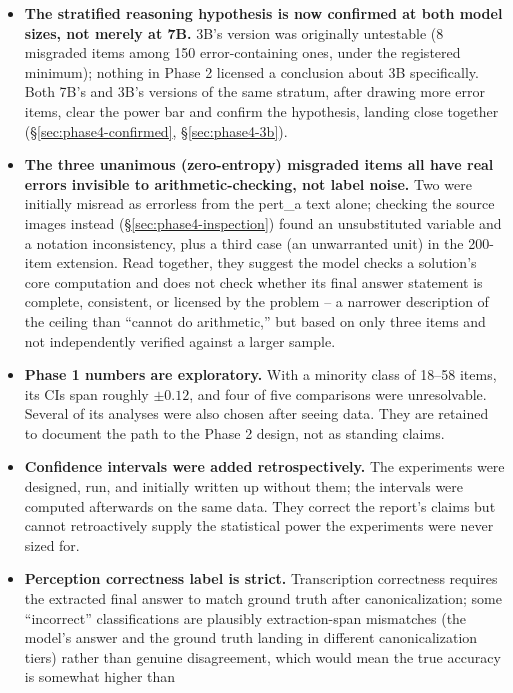 \documentclass[11pt]{article}
\begin{document}
\begin{itemize}
  \item \textbf{The stratified reasoning hypothesis is now confirmed at both
    model sizes, not merely at 7B.} 3B's version was originally untestable
    (8 misgraded items among 150 error-containing ones, under the
    registered minimum); nothing in Phase 2 licensed a conclusion about 3B
    specifically. Both 7B's and 3B's versions of the same stratum, after
    drawing more error items, clear the power bar and confirm the
    hypothesis, landing close together (\S\ref{sec:phase4-confirmed},
    \S\ref{sec:phase4-3b}).
  \item \textbf{The three unanimous (zero-entropy) misgraded items all have
    real errors invisible to arithmetic-checking, not label noise.} Two were
    initially misread as errorless from the pert\_a text alone; checking the
    source images instead (\S\ref{sec:phase4-inspection}) found an
    unsubstituted variable and a notation inconsistency, plus a third case
    (an unwarranted unit) in the 200-item extension. Read together, they
    suggest the model checks a solution's core computation and does not
    check whether its final answer statement is complete, consistent, or
    licensed by the problem -- a narrower description of the ceiling than
    ``cannot do arithmetic,'' but based on only three items and not
    independently verified against a larger sample.
  \item \textbf{Phase 1 numbers are exploratory.} With a minority class of
    18--58 items, its CIs span roughly $\pm 0.12$, and four of five comparisons
    were unresolvable. Several of its analyses were also chosen after seeing
    data. They are retained to document the path to the Phase 2 design, not as
    standing claims.
  \item \textbf{Confidence intervals were added retrospectively.} The
    experiments were designed, run, and initially written up without them; the
    intervals were computed afterwards on the same data. They correct the
    report's claims but cannot retroactively supply the statistical power the
    experiments were never sized for.
  \item \textbf{Perception correctness label is strict.} Transcription
    correctness requires the extracted final answer to match ground truth
    after canonicalization; some ``incorrect'' classifications are plausibly
    extraction-span mismatches (the model's answer and the ground truth
    landing in different canonicalization tiers) rather than genuine
    disagreement, which would mean the true accuracy is somewhat higher than

\end{itemize}
\end{document}
